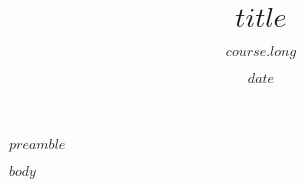\documentclass[12pt, a4paper $if(answers)$, answers $endif$]{exam}
\title{\sffamily $title$}
\author{$course.long$}
\date{$date$}
\begin{document}
\maketitle
\thispagestyle{headandfoot}

\emph{$preamble$}

\begin{questions}
    $body$
\end{questions}
\end{document}
